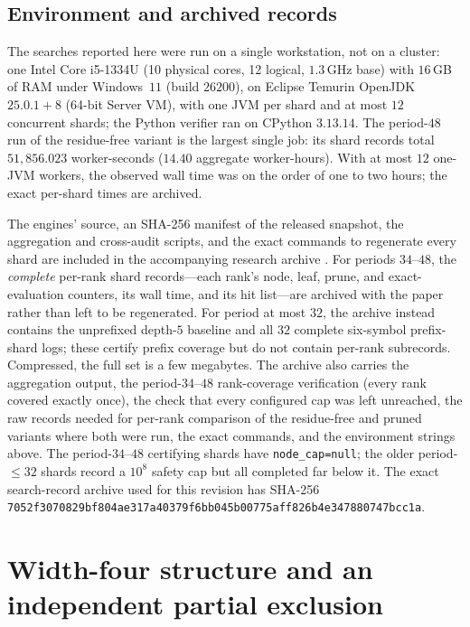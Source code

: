 \documentclass[11pt,letterpaper]{article}
\theoremstyle{plain}
\theoremstyle{definition}
\begin{document}
\begin{NoHyper}
\subsection*{Environment and archived records}

The searches reported here were run on a single workstation, not on a cluster: one
Intel Core i5-1334U (10 physical cores, 12 logical, $1.3$\,GHz base) with $16$\,GB of
RAM under Windows~$11$ (build $26200$), on Eclipse Temurin OpenJDK $25.0.1{+}8$
(64-bit Server VM), with one JVM per shard and at most $12$ concurrent shards; the
Python verifier ran on CPython $3.13.14$. The period-$48$ run of the residue-free
variant is the largest single job: its shard records total $51{,}856.023$ worker-seconds
($14.40$ aggregate worker-hours). With at most $12$ one-JVM workers, the observed wall
time was on the order of one to two hours; the exact per-shard times are archived.

The engines' source, an SHA-256 manifest of the released snapshot, the aggregation
and cross-audit scripts, and the exact commands to regenerate every shard are included
in the accompanying research archive \cite{Repo}. For periods $34$--$48$, the
\emph{complete} per-rank shard records---each rank's node, leaf, prune, and
exact-evaluation counters, its wall time, and its hit list---are archived with the
paper rather than left to be regenerated. For period at most $32$, the archive instead
contains the unprefixed depth-$5$ baseline and all $32$ complete six-symbol prefix-shard
logs; these certify prefix coverage but do not contain per-rank subrecords. Compressed,
the full set is a few megabytes.
The archive also carries the aggregation output, the period-$34$--$48$ rank-coverage
verification (every rank covered exactly once), the
check that every configured cap was left unreached, the raw records needed for
per-rank comparison of the residue-free and pruned variants where both were run, the
exact commands, and the
environment strings above. The period-$34$--$48$ certifying shards have
\texttt{node\_cap=null}; the older period-$\le32$ shards record a $10^8$ safety cap
but all completed far below it. The exact search-record archive used for this revision
has SHA-256
\texttt{7052f3070829bf804ae317a40379f6bb045b00775aff826b4e347880747bcc1a}.

\section{Width-four structure and an independent partial exclusion}\label{app:width4arith}


\end{NoHyper}
\end{document}
